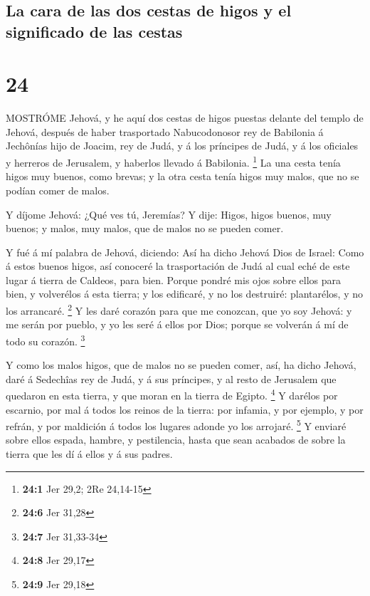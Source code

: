 \hypertarget{la-cara-de-las-dos-cestas-de-higos-y-el-significado-de-las-cestas}{%
\subsection{La cara de las dos cestas de higos y el significado de las
cestas}\label{la-cara-de-las-dos-cestas-de-higos-y-el-significado-de-las-cestas}}

\hypertarget{section-23}{%
\section{24}\label{section-23}}

 MOSTRÓME Jehová, y he aquí dos cestas de higos puestas
delante del templo de Jehová, después de haber trasportado Nabucodonosor
rey de Babilonia á Jechônías hijo de Joacim, rey de Judá, y á los
príncipes de Judá, y á los oficiales y herreros de Jerusalem, y haberlos
llevado á Babilonia. \footnote{\textbf{24:1} Jer 29,2; 2Re 24,14-15}
 La una cesta tenía higos muy buenos, como brevas; y la otra
cesta tenía higos muy malos, que no se podían comer de malos.

 Y díjome Jehová: ¿Qué ves tú, Jeremías? Y dije: Higos,
higos buenos, muy buenos; y malos, muy malos, que de malos no se pueden
comer.

 Y fué á mí palabra de Jehová, diciendo:  Así ha
dicho Jehová Dios de Israel: Como á estos buenos higos, así conoceré la
trasportación de Judá al cual eché de este lugar á tierra de Caldeos,
para bien.  Porque pondré mis ojos sobre ellos para bien, y
volverélos á esta tierra; y los edificaré, y no los destruiré:
plantarélos, y no los arrancaré. \footnote{\textbf{24:6} Jer 31,28}
 Y les daré corazón para que me conozcan, que yo soy Jehová:
y me serán por pueblo, y yo les seré á ellos por Dios; porque se
volverán á mí de todo su corazón. \footnote{\textbf{24:7} Jer 31,33-34}

 Y como los malos higos, que de malos no se pueden comer,
así, ha dicho Jehová, daré á Sedechîas rey de Judá, y á sus príncipes, y
al resto de Jerusalem que quedaron en esta tierra, y que moran en la
tierra de Egipto. \footnote{\textbf{24:8} Jer 29,17}  Y
darélos por escarnio, por mal á todos los reinos de la tierra: por
infamia, y por ejemplo, y por refrán, y por maldición á todos los
lugares adonde yo los arrojaré. \footnote{\textbf{24:9} Jer 29,18}
 Y enviaré sobre ellos espada, hambre, y pestilencia, hasta
que sean acabados de sobre la tierra que les dí á ellos y á sus padres.

